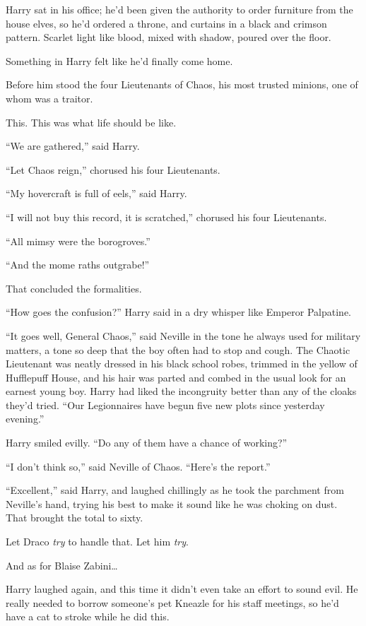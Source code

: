 Harry sat in his office; he’d been given the authority to order furniture from the house elves, so he’d ordered a throne, and curtains in a black and crimson pattern. Scarlet light like blood, mixed with shadow, poured over the floor.

Something in Harry felt like he’d finally come home.

Before him stood the four Lieutenants of Chaos, his most trusted minions, one of whom was a traitor.

This. This was what life should be like.

“We are gathered,” said Harry.

“Let Chaos reign,” chorused his four Lieutenants.

“My hovercraft is full of eels,” said Harry.

“I will not buy this record, it is scratched,” chorused his four Lieutenants.

“All mimsy were the borogroves.”

“And the mome raths outgrabe!”

That concluded the formalities.

“How goes the confusion?” Harry said in a dry whisper like Emperor Palpatine.

“It goes well, General Chaos,” said Neville in the tone he always used for military matters, a tone so deep that the boy often had to stop and cough. The Chaotic Lieutenant was neatly dressed in his black school robes, trimmed in the yellow of Hufflepuff House, and his hair was parted and combed in the usual look for an earnest young boy. Harry had liked the incongruity better than any of the cloaks they’d tried.
“Our Legionnaires have begun five new plots since yesterday evening.”

Harry smiled evilly.
“Do any of them have a chance of working?”

“I don’t think so,” said Neville of Chaos.
“Here’s the report.”

“Excellent,” said Harry, and laughed chillingly as he took the parchment from Neville’s hand, trying his best to make it sound like he was choking on dust. That brought the total to sixty.

Let Draco \emph{try} to handle that. Let him \emph{try}.

And as for Blaise Zabini…

Harry laughed again, and this time it didn’t even take an effort to sound evil. He really needed to borrow someone’s pet Kneazle for his staff meetings, so he’d have a cat to stroke while he did this.


